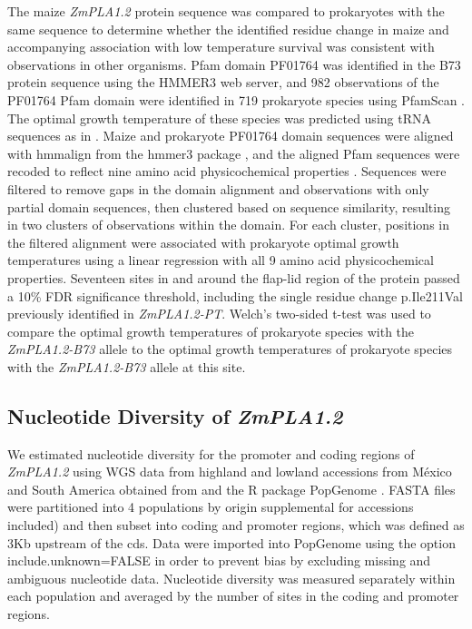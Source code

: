 \documentclass[9pt,twocolumn,twoside,lineno]{BioRxiv}
\begin{document}
The maize \textit{ZmPLA1.2} protein sequence was compared to prokaryotes with the same sequence to determine whether the identified residue change in maize and accompanying association with low temperature survival was consistent with observations in other organisms. 
Pfam domain PF01764 was identified in the B73 protein sequence using the HMMER3 web server, and 982 observations of the PF01764 Pfam domain were identified in 719 prokaryote species using PfamScan \cite{Potter2018-tk, El-Gebali2019-pw}. 
The optimal growth temperature of these species was predicted using tRNA sequences as in \cite{Cimen2020-dm}. 
Maize and prokaryote PF01764 domain sequences were aligned with hmmalign from the hmmer3 package \cite{Eddy2011-pd}, and the aligned Pfam sequences were recoded to reflect nine amino acid physicochemical properties \cite{Li2016-ut}. 
Sequences were filtered to remove gaps in the domain alignment and observations with only partial domain sequences, then clustered based on sequence similarity, resulting in two clusters of observations within the domain. 
For each cluster, positions in the filtered alignment were associated with prokaryote optimal growth temperatures using a linear regression with all 9 amino acid physicochemical properties. 
Seventeen sites in and around the flap-lid region of the protein passed a 10\% FDR significance threshold, including the single residue change p.Ile211Val previously identified in \textit{ZmPLA1.2-PT}. 
Welch’s two-sided t-test was used to compare the optimal growth temperatures of prokaryote species with the \textit{ZmPLA1.2-B73} allele to the optimal growth temperatures of prokaryote species with the \textit{ZmPLA1.2-B73} allele at this site.

\subsection{Nucleotide Diversity of \textit{ZmPLA1.2} }
We estimated nucleotide diversity for the promoter and coding regions of \textit{ZmPLA1.2} using WGS data from highland and lowland accessions from M\'exico and South America obtained from \cite{Wang2017-bc} and the R package PopGenome \cite{Pfeifer2014-bg}. %
FASTA files were partitioned into 4 populations by origin  supplemental for accessions included) and then subset into coding and promoter regions, which was defined as 3Kb upstream of the cds.  %
Data were imported into PopGenome using the option include.unknown=FALSE in order to prevent bias by excluding missing and ambiguous nucleotide data.
Nucleotide diversity was measured separately within each population and averaged by the number of sites in the coding and promoter regions. %
\end{document}
